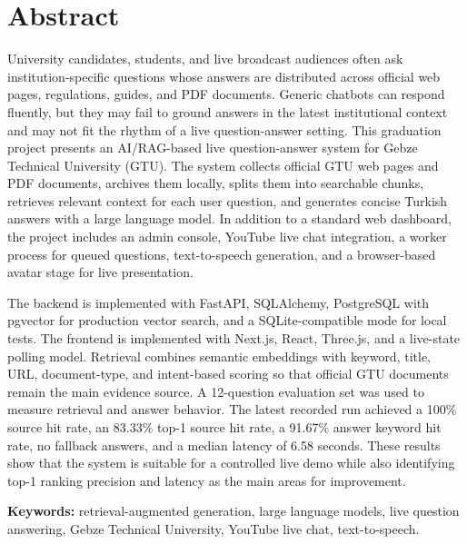 \chapter*{Abstract}

University candidates, students, and live broadcast audiences often ask institution-specific questions whose answers are distributed across official web pages, regulations, guides, and PDF documents. Generic chatbots can respond fluently, but they may fail to ground answers in the latest institutional context and may not fit the rhythm of a live question-answer setting. This graduation project presents an AI/RAG-based live question-answer system for Gebze Technical University (GTU). The system collects official GTU web pages and PDF documents, archives them locally, splits them into searchable chunks, retrieves relevant context for each user question, and generates concise Turkish answers with a large language model. In addition to a standard web dashboard, the project includes an admin console, YouTube live chat integration, a worker process for queued questions, text-to-speech generation, and a browser-based avatar stage for live presentation.

The backend is implemented with FastAPI, SQLAlchemy, PostgreSQL with pgvector for production vector search, and a SQLite-compatible mode for local tests. The frontend is implemented with Next.js, React, Three.js, and a live-state polling model. Retrieval combines semantic embeddings with keyword, title, URL, document-type, and intent-based scoring so that official GTU documents remain the main evidence source. A 12-question evaluation set was used to measure retrieval and answer behavior. The latest recorded run achieved a 100\% source hit rate, an 83.33\% top-1 source hit rate, a 91.67\% answer keyword hit rate, no fallback answers, and a median latency of 6.58 seconds. These results show that the system is suitable for a controlled live demo while also identifying top-1 ranking precision and latency as the main areas for improvement.

\vfill
\textbf{Keywords:} retrieval-augmented generation, large language models, live question answering, Gebze Technical University, YouTube live chat, text-to-speech.
\clearpage
